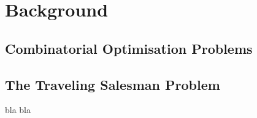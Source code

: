 \chapter{Background}
\label{chap:BG}
\section{Combinatorial Optimisation Problems}
\label{sec:CO}
\section{The Traveling Salesman Problem}
\label{sec:TSP}

bla bla
